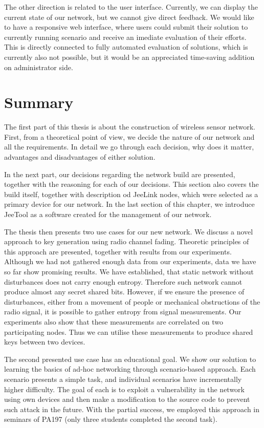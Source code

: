 \documentclass[
  print, %
  Table,   %
  nolof,     %
  nolot,     %
           oneside
]{fithesis3}
\begin{document}
  The other direction is related to the user interface. Currently, we can display the current state of our network, but we cannot give direct feedback. We would like to have a responsive web interface, where users could submit their solution to currently running scenario and receive an imediate evaluation of their efforts. This is directly connected to fully automated evaluation of solutions, which is currently also not possible, but it would be an appreciated time-saving addition on administrator side.

\chapter{Summary}
The first part of this thesis is about the construction of wireless sensor network. First, from a theoretical point of view, we decide the nature of our network and all the requirements. In detail we go through each decision, why does it matter, advantages and disadvantages of either solution.

In the next part, our decisions regarding the network build are presented, together with the reasoning for each of our decisions. This section also covers the build itself, together with description od JeeLink nodes, which were selected as a primary device for our network. In the last section of this chapter, we introduce JeeTool as a software created for the management of our network.

The thesis then presents two use cases for our new network. We discuss a novel approach to key generation using radio channel fading. Theoretic principles of this approach are presented, together with results from our experiments. Although we had not gathered enough data from our experiments, data we have so far show promising results. We have established, that static network without disturbances does not carry enough entropy. Therefore such network cannot produce almost any secret shared bits. However, if we ensure the presence of disturbances, either from a movement of people or mechanical obstructions of the radio signal, it is possible to gather entropy from signal measurements. Our experiments also show that these measurements are correlated on two participating nodes. Thus we can utilise these measurements to produce shared keys between two devices.

The second presented use case has an educational goal. We show our solution to learning the basics of ad-hoc networking through scenario-based approach. Each scenario presents a simple task, and individual scenarios have incrementally higher difficulty. The goal of each is to exploit a vulnerability in the network using own devices and then make a modification to the source code to prevent such attack in the future. With the partial success, we employed this approach in seminars of PA197 (only three students completed the second task).
\end{document}
